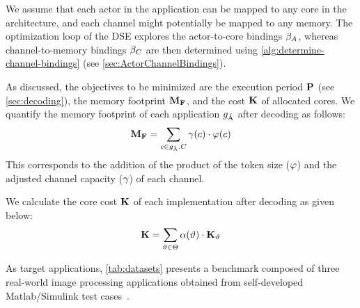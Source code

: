 We assume that each actor in the application can be mapped to any core in the architecture, and each channel might potentially be mapped to any memory.
The optimization loop of the \ac{DSE} explores the actor-to-core bindings $\beta_A$, whereas channel-to-memory bindings $\beta_C$ are then determined using \cref{alg:determine-channel-bindings} (see \cref{sec:ActorChannelBindings}).
\par
As discussed, the objectives to be minimized are the execution period $\mathbf{P}$ (see \cref{sec:decoding}), the memory footprint $\mathbf{M_F}$, and the cost $\mathbf{K}$ of allocated cores.
We quantify the memory footprint of each application $g_{\tilde{\textrm{A}}}$ after decoding as follows:
\begin{equation}\label{eq:memFootprint}
  \MemoryFootprint = \sum_{\channel\in\mrbgraph.\SetChannels} \Capacity(\channel) \cdot \Size(\channel)
\end{equation}
This corresponds to the addition of the product of the token size ($\varphi$) and the adjusted channel capacity ($\gamma$) of each channel.
\par
We calculate the core cost $\mathbf{K}$ of each implementation after decoding as given below:
\begin{equation}\label{eq:coreCost}
  \CoreCost = \sum_{\coretype\in\SetCoreTypes} \allocation(\coretype) \cdot \CoreCost_{\coretype}
\end{equation}
\par
As target applications, \cref{tab:datasets} presents a benchmark composed of three real-world image processing applications obtained from self-developed Matlab/Simulink test cases~\cite{Letras:2017}.
